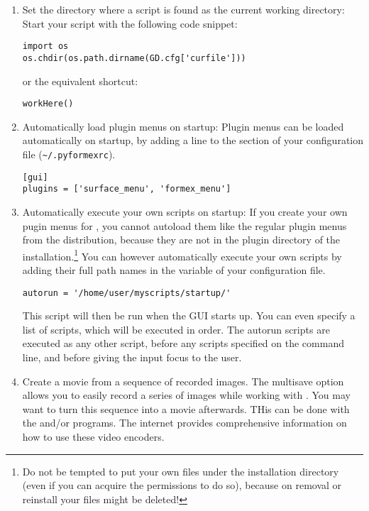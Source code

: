 \begin{enumerate}
\item Set the directory where a script is found as the current working directory:
Start your script with the following code snippet:
\begin{verbatim}
import os
os.chdir(os.path.dirname(GD.cfg['curfile']))
\end{verbatim}
or the equivalent shortcut:
\begin{verbatim}
workHere()
\end{verbatim}

\item Automatically load plugin menus on startup:
Plugin menus can be loaded automatically on \pyformex startup, by adding a line to the  section of your configuration file (\verb|~/.pyformexrc|).
\begin{verbatim}
[gui]
plugins = ['surface_menu', 'formex_menu']
\end{verbatim}

\item Automatically execute your own scripts on startup:
If you create your own pugin menus for \pyformex, you cannot autoload them like the regular plugin menus from the distribution, because they are not in the plugin directory of the installation.\footnote{Do not be tempted to put your own files under the installation directory (even if you can acquire the permissions to do so), because on removal or reinstall your files might be deleted!}
You can however automatically execute your own scripts by adding their full path names in the  variable of your configuration file.
\begin{verbatim}
autorun = '/home/user/myscripts/startup/'
\end{verbatim}
This script will then be run when the \pyformex GUI starts up. You can even specify a list of scripts, which will be executed in order.
The autorun scripts are executed as any other \pyformex script, before any scripts specified on the command line, and before giving the input focus to the user.

\item Create a movie from a sequence of recorded images.
The multisave option allows you to easily record a series of images while working with \pyformex. You may want to turn this sequence into a movie afterwards. THis can be done with the  and/or  programs. The internet provides comprehensive information on how to use these video encoders. 


\end{enumerate}
